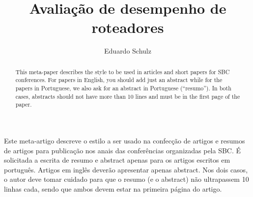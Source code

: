 \documentclass[12pt]{article}
\title{Avaliação de desempenho de roteadores}
\author{Eduardo Schulz\inst{1}}
\begin{document}
 

\maketitle

\begin{abstract}
  This meta-paper describes the style to be used in articles and short papers
  for SBC conferences. For papers in English, you should add just an abstract
  while for the papers in Portuguese, we also ask for an abstract in
  Portuguese (``resumo''). In both cases, abstracts should not have more than
  10 lines and must be in the first page of the paper.
\end{abstract}
     
\begin{resumo} 
  Este meta-artigo descreve o estilo a ser usado na confecção de artigos e
  resumos de artigos para publicação nos anais das conferências organizadas
  pela SBC. É solicitada a escrita de resumo e abstract apenas para os artigos
  escritos em português. Artigos em inglês deverão apresentar apenas abstract.
  Nos dois casos, o autor deve tomar cuidado para que o resumo (e o abstract)
  não ultrapassem 10 linhas cada, sendo que ambos devem estar na primeira
  página do artigo.
\end{resumo}










\end{document}
